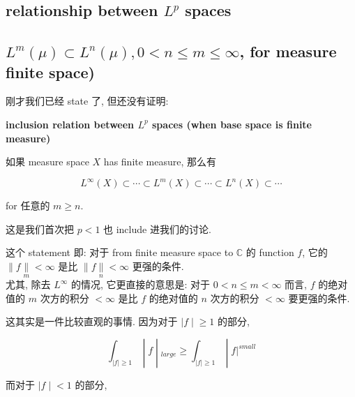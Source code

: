 \documentclass{qlnotes-export}
\begin{document}
\subsection{\texorpdfstring{relationship between \(L^{p}\) spaces}{relationship between L\^{}\{p\} spaces}}\label{relationship-between-lp-spaces}

\subsection{\texorpdfstring{\(L^{m}(\mu) \subset L^{n}(\mu),0 < n \leq m \leq \infty\), for measure finite space)}{L\^{}\{m\}(\textbackslash mu) \textbackslash subset L\^{}\{n\}(\textbackslash mu),0 \textless{} n \textbackslash leq m \textbackslash leq \textbackslash infty, for measure finite space)}}\label{lmmu-subset-lnmu0-n-leq-m-leq-infty-for-measure-finite-space}

刚才我们已经 state 了, 但还没有证明:

\begin{theorem}{\protect{}\label{kn-inclusion-relation-between-l-p-spaces-when-base-space-is-finite}{\textbf{inclusion
relation between \(L^{p}\) spaces (when base space is finite measure)}}}

如果 measure space \(X\) has finite measure, 那么有

\[L^{\infty}(X) \subset \cdots \subset L^{m}(X) \subset \cdots \subset L^{n}(X) \subset \cdots\]

for 任意的 \(m \geq n\).

\end{theorem}

这是我们首次把 \(p < 1\) 也 include 进我们的讨论.

这个 statement 即: 对于 from finite measure space to \(\mathbb{C}\) 的 function \(f\), 它的 \(\parallel f\underset{m}{\parallel} < \infty\) 是比 \(\parallel f\underset{n}{\parallel} < \infty\) 更强的条件.\\
尤其, 除去 \(L^{\infty}\) 的情况, 它更直接的意思是: 对于 \(0 < n \leq m < \infty\) 而言, \(f\) 的绝对值的 \(m\) 次方的积分 \(< \infty\) 是比 \(f\) 的绝对值的 \(n\) 次方的积分 \(< \infty\) 要更强的条件.

这其实是一件比较直观的事情. 因为对于 \(\left. |f \middle| \geq 1 \right.\) 的部分,

\[\left. \int_{|f| \geq 1} \middle| f \middle| {}_{large} \geq \int_{|f| \geq 1} \middle| f|^{small} \right.\]

而对于 \(\left. |f \middle| < 1 \right.\) 的部分,
\end{document}
